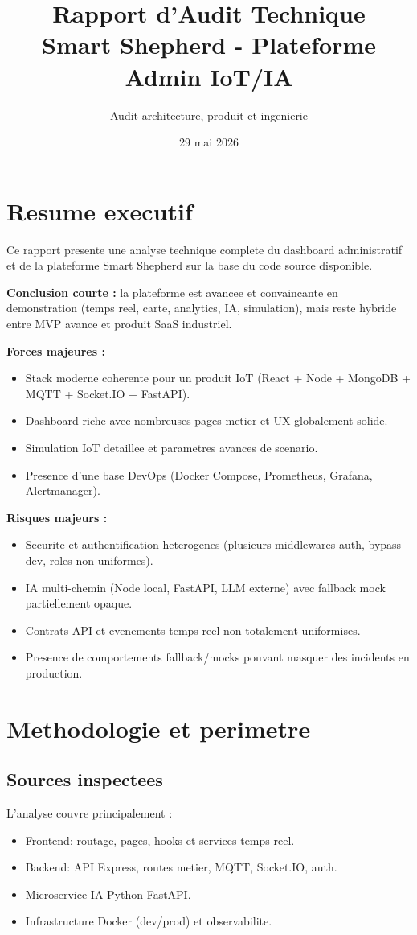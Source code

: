 \documentclass[12pt,a4paper]{article}
\title{\textbf{Rapport d'Audit Technique}\\Smart Shepherd - Plateforme Admin IoT/IA}
\author{Audit architecture, produit et ingenierie}
\date{29 mai 2026}
\begin{document}
\maketitle
\tableofcontents
\newpage

\section{Resume executif}
Ce rapport presente une analyse technique complete du dashboard administratif et de la plateforme Smart Shepherd sur la base du code source disponible.\

\textbf{Conclusion courte :} la plateforme est avancee et convaincante en demonstration (temps reel, carte, analytics, IA, simulation), mais reste hybride entre MVP avance et produit SaaS industriel.\

\textbf{Forces majeures :}
\begin{itemize}
  \item Stack moderne coherente pour un produit IoT (React + Node + MongoDB + MQTT + Socket.IO + FastAPI).
  \item Dashboard riche avec nombreuses pages metier et UX globalement solide.
  \item Simulation IoT detaillee et parametres avances de scenario.
  \item Presence d'une base DevOps (Docker Compose, Prometheus, Grafana, Alertmanager).
\end{itemize}

\textbf{Risques majeurs :}
\begin{itemize}
  \item Securite et authentification heterogenes (plusieurs middlewares auth, bypass dev, roles non uniformes).
  \item IA multi-chemin (Node local, FastAPI, LLM externe) avec fallback mock partiellement opaque.
  \item Contrats API et evenements temps reel non totalement uniformises.
  \item Presence de comportements fallback/mocks pouvant masquer des incidents en production.
\end{itemize}

\section{Methodologie et perimetre}
\subsection{Sources inspectees}
L'analyse couvre principalement :
\begin{itemize}
  \item Frontend: routage, pages, hooks et services temps reel.
  \item Backend: API Express, routes metier, MQTT, Socket.IO, auth.
  \item Microservice IA Python FastAPI.
  \item Infrastructure Docker (dev/prod) et observabilite.
\end{itemize}
\end{document}
